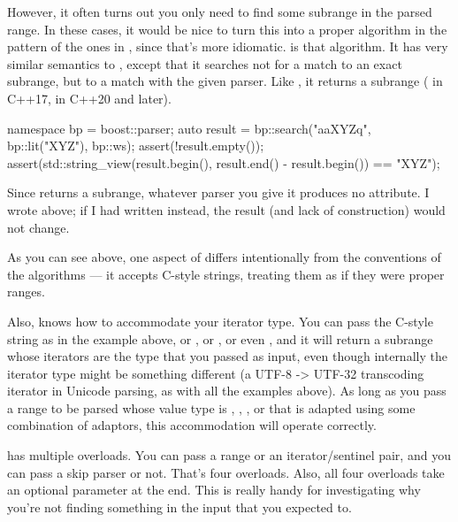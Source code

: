 \documentclass{MyBook}
\begin{document}
However, it often turns out you only need to find some subrange in the parsed range. In these cases, it would be nice to turn this into a proper algorithm in the pattern of the ones in , since that's more idiomatic.  is that algorithm. It has very similar semantics to , except that it searches not for a match to an exact subrange, but to a match with the given parser. Like , it returns a subrange ( in C++17,  in C++20 and later).

\begin{code}
namespace bp = boost::parser;
auto result = bp::search("aaXYZq", bp::lit("XYZ"), bp::ws);
assert(!result.empty());
assert(std::string_view(result.begin(), result.end() - result.begin()) == "XYZ");
\end{code}

Since  returns a subrange, whatever parser you give it produces no attribute. I wrote  above; if I had written  instead, the result (and lack of  construction) would not change.

As you can see above, one aspect of  differs intentionally from the conventions of the  algorithms --- it accepts C-style strings, treating them as if they were proper ranges.

Also,  knows how to accommodate your iterator type. You can pass the C-style string  as in the example above, or , or , or even , and it will return a subrange whose iterators are the type that you passed as input, even though internally the iterator type might be something different (a UTF-8 -> UTF-32 transcoding iterator in Unicode parsing, as with all the  examples above). As long as you pass a range to be parsed whose value type is , , , or that is adapted using some combination of  adaptors, this accommodation will operate correctly.

 has multiple overloads. You can pass a range or an iterator/sentinel pair, and you can pass a skip parser or not. That's four overloads. Also, all four overloads take an optional  parameter at the end. This is really handy for investigating why you're not finding something in the input that you expected to.
\end{document}
